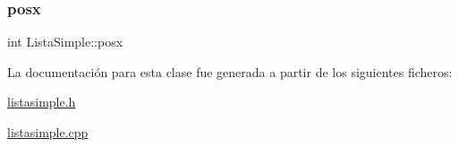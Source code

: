 \mbox{\label{class_lista_simple_a287deeb5d9e391d810d309798e8bf026}} 
\subsubsection{\texorpdfstring{posx}{posx}}
{\footnotesize\ttfamily int Lista\+Simple\+::posx}



La documentación para esta clase fue generada a partir de los siguientes ficheros\+:\begin{DoxyCompactItemize}
\item 
\mbox{\hyperlink{listasimple_8h}{listasimple.\+h}}\item 
\mbox{\hyperlink{listasimple_8cpp}{listasimple.\+cpp}}\end{DoxyCompactItemize}
